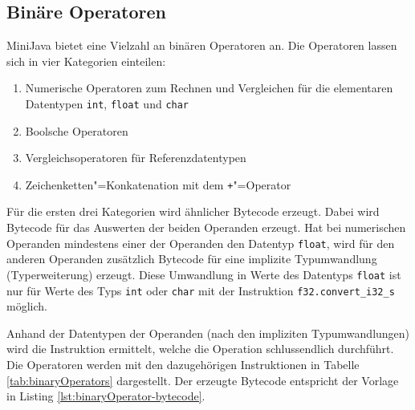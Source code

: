 

\pagebreak
\subsection{Binäre Operatoren}

MiniJava bietet eine Vielzahl an binären Operatoren an. Die Operatoren lassen sich in vier Kategorien einteilen:
\begin{enumerate}
    \item Numerische Operatoren zum Rechnen und Vergleichen für die elementaren Datentypen \lstinline{int}, \lstinline{float} und \lstinline{char}
    \item Boolsche Operatoren
    \item Vergleichsoperatoren für Referenzdatentypen
    \item Zeichenketten"=Konkatenation mit dem \lstinline{+}"=Operator
\end{enumerate}

Für die ersten drei Kategorien wird ähnlicher Bytecode erzeugt. Dabei wird Bytecode für das Auswerten der beiden Operanden erzeugt. Hat bei numerischen Operanden mindestens einer der Operanden den Datentyp \lstinline{float}, wird für den anderen Operanden zusätzlich Bytecode für eine implizite Typumwandlung (Typerweiterung) erzeugt. Diese Umwandlung in Werte des Datentyps \lstinline{float} ist nur für Werte des Typs \lstinline{int} oder \lstinline{char} mit der Instruktion \lstinline{f32.convert_i32_s} möglich.

Anhand der Datentypen der Operanden (nach den impliziten Typumwandlungen) wird die Instruktion ermittelt, welche die Operation schlussendlich durchführt. Die Operatoren werden mit den dazugehörigen Instruktionen in Tabelle \ref{tab:binaryOperators} dargestellt. Der erzeugte Bytecode entspricht der Vorlage in Listing \ref{lst:binaryOperator-bytecode}.

